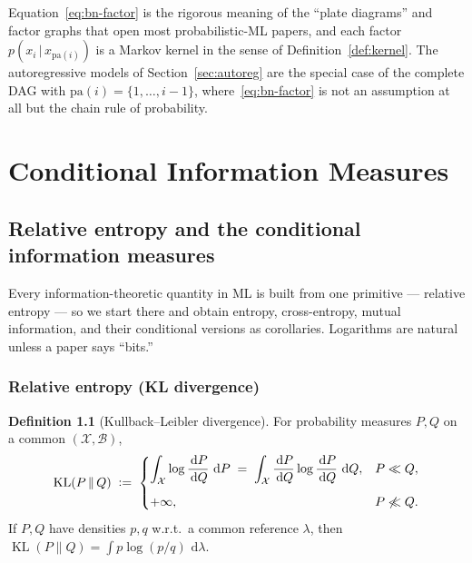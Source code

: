 \documentclass[11pt,oneside]{report}
\theoremstyle{plain}
\theoremstyle{definition}
\newtheorem{definition}[theorem]{Definition}
\theoremstyle{remark}
\newcommand{\dd}{\,\mathrm{d}}
\newcommand{\Bcal}{\mathcal{B}}
\newcommand{\Xcal}{\mathcal{X}}
\newcommand{\defeq}{\vcentcolon=}
\newcommand{\given}{\,\vert\,}
\DeclareMathOperator{\KL}{KL}
\numberwithin{equation}{chapter}
\begin{document}
Equation~\eqref{eq:bn-factor} is the rigorous meaning of the ``plate
diagrams'' and factor graphs that open most probabilistic-ML papers, and
each factor $p(x_i\given x_{\mathrm{pa}(i)})$ is a Markov kernel in the
sense of Definition~\ref{def:kernel}. The autoregressive models of
Section~\ref{sec:autoreg} are the special case of the complete DAG with
$\mathrm{pa}(i)=\{1,\dots,i-1\}$, where~\eqref{eq:bn-factor} is not an
assumption at all but the chain rule of probability.

\part{Conditional Information Measures}\label{part:info}

\chapter{Relative entropy and the conditional information measures}
\label{ch:info}

Every information-theoretic quantity in ML is built from one primitive ---
relative entropy --- so we start there and obtain entropy, cross-entropy,
mutual information, and their conditional versions as corollaries. Logarithms
are natural unless a paper says ``bits.''

\section{Relative entropy (KL divergence)}

\begin{definition}[Kullback--Leibler divergence]\label{def:kl}
For probability measures $P,Q$ on a common $(\Xcal,\Bcal)$,
\begin{equation}\label{eq:kl}
  \KL(P\,\|\,Q)\;\defeq\;
  \begin{cases}
    \displaystyle\int_\Xcal \log\frac{\dd P}{\dd Q}\,\dd P
      \;=\;\int_\Xcal \frac{\dd P}{\dd Q}\log\frac{\dd P}{\dd Q}\,\dd Q,
      & P\ll Q,\\[1.2em]
    +\infty, & P\not\ll Q.
  \end{cases}
\end{equation}
If $P,Q$ have densities $p,q$ w.r.t.\ a common reference $\lambda$, then
$\KL(P\|Q)=\int p\log(p/q)\,\dd\lambda$.
\end{definition}
\end{document}
